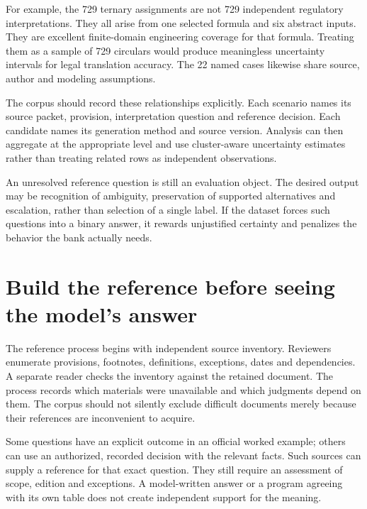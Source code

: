 
For example, the 729 ternary assignments are not 729 independent regulatory
interpretations. They all arise from one selected formula and six abstract inputs.
They are excellent finite-domain engineering coverage for that formula. Treating
them as a sample of 729 circulars would produce meaningless uncertainty intervals
for legal translation accuracy. The 22 named cases likewise share source,
author and modeling assumptions.

The corpus should record these relationships explicitly. Each scenario names its
source packet, provision, interpretation question and reference decision. Each
candidate names its generation method and source version. Analysis can then
aggregate at the appropriate level and use cluster-aware uncertainty estimates
rather than treating related rows as independent observations.

An unresolved reference question is still an evaluation object. The desired
output may be recognition of ambiguity, preservation of supported alternatives
and escalation, rather than selection of a single label. If the dataset forces
such questions into a binary answer, it rewards unjustified certainty and
penalizes the behavior the bank actually needs.

\section{Build the reference before seeing the model's answer}
\label{merge:M09:02}


The reference process begins with independent source inventory. Reviewers enumerate
provisions, footnotes, definitions, exceptions, dates and dependencies. A separate
reader checks the inventory against the retained document. The process records
which materials were unavailable and which judgments depend on them. The corpus
should not silently exclude difficult documents merely because their references
are inconvenient to acquire.

Some questions have an explicit outcome in an official worked example; others
can use an authorized, recorded decision with the relevant facts. Such sources
can supply a reference for that exact question. They still require an assessment
of scope, edition and exceptions. A model-written answer or a program agreeing
with its own table does not create independent support for the meaning.

